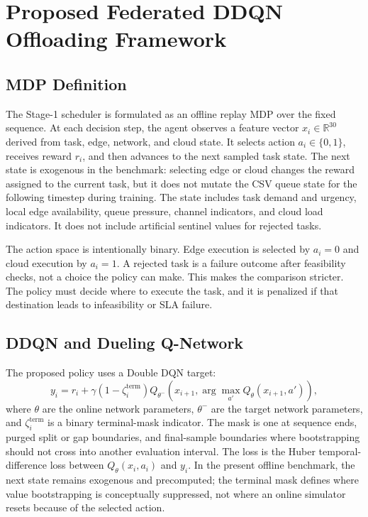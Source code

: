 \section{Proposed Federated DDQN Offloading Framework}
\label{sec:fed_ddqn}

\subsection{MDP Definition}

The Stage-1 scheduler is formulated as an offline replay MDP over the fixed \dataset{} sequence. At each decision step, the agent observes a feature vector $x_i\in\mathbb{R}^{30}$ derived from task, edge, network, and cloud state. It selects action $a_i\in\{0,1\}$, receives reward $r_i$, and then advances to the next sampled task state. The next state is exogenous in the benchmark: selecting edge or cloud changes the reward assigned to the current task, but it does not mutate the CSV queue state for the following timestep during training. The state includes task demand and urgency, local edge availability, queue pressure, channel indicators, and cloud load indicators. It does not include artificial sentinel values for rejected tasks.

The action space is intentionally binary. Edge execution is selected by $a_i=0$ and cloud execution by $a_i=1$. A rejected task is a failure outcome after feasibility checks, not a choice the policy can make. This makes the comparison stricter. The policy must decide where to execute the task, and it is penalized if that destination leads to infeasibility or SLA failure.

\subsection{DDQN and Dueling Q-Network}

The proposed policy uses a Double DQN target:
\begin{equation}
y_i=r_i+\gamma\left(1-\zeta_i^{\mathrm{term}}\right)
Q_{\theta^-}\left(x_{i+1},\arg\max_{a'}Q_{\theta}(x_{i+1},a')\right),
\label{eq:ddqn_target_main}
\end{equation}
where $\theta$ are the online network parameters, $\theta^-$ are the target network parameters, and $\zeta_i^{\mathrm{term}}$ is a binary terminal-mask indicator. The mask is one at sequence ends, purged split or gap boundaries, and final-sample boundaries where bootstrapping should not cross into another evaluation interval. The loss is the Huber temporal-difference loss between $Q_\theta(x_i,a_i)$ and $y_i$. In the present offline benchmark, the next state remains exogenous and precomputed; the terminal mask defines where value bootstrapping is conceptually suppressed, not where an online simulator resets because of the selected action.

